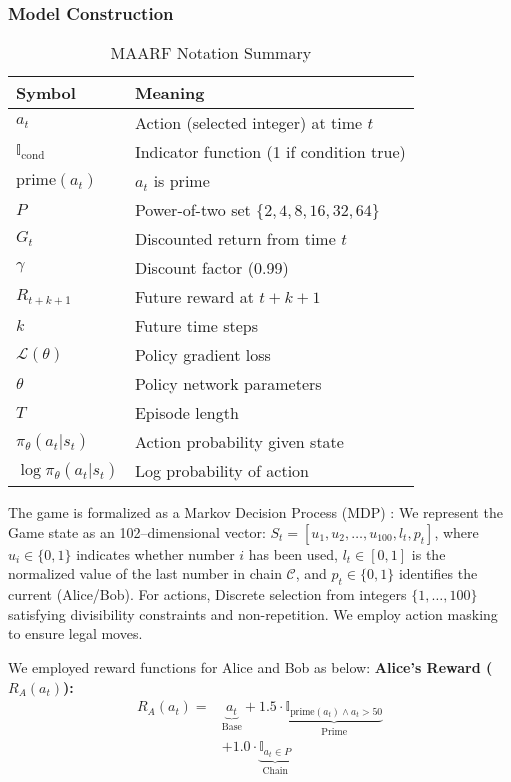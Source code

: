 \documentclass[twocolumn, a4paper]{article}
\begin{document}
\subsubsection{Model Construction}
\begin{table}[h]
\centering
\scriptsize
\caption{MAARF Notation Summary}
\begin{tabular}{@{}ll@{}}
\toprule
\textbf{Symbol} & \textbf{Meaning} \\
\midrule
$a_t$ & Action (selected integer) at time $t$ \\
$\mathbb{I}_{\text{cond}}$ & Indicator function (1 if condition true) \\
$\text{prime}(a_t)$ & $a_t$ is prime \\
$P$ & Power-of-two set $\{2,4,8,16,32,64\}$ \\
$G_t$ & Discounted return from time $t$ \\
$\gamma$ & Discount factor (0.99) \\
$R_{t+k+1}$ & Future reward at $t+k+1$ \\
$k$ & Future time steps \\
$\mathcal{L}(\theta)$ & Policy gradient loss \\
$\theta$ & Policy network parameters \\
$T$ & Episode length \\
$\pi_\theta(a_t|s_t)$ & Action probability given state \\
$\log\pi_\theta(a_t|s_t)$ & Log probability of action \\
\bottomrule
\end{tabular}
\end{table}
The game is formalized as a Markov Decision Process (MDP) \textsuperscript{\cite{sutton2018reinforcement}}:
We represent the Game state as an 102--dimensional vector: $S_t=[u_1, u_2, \dots, u_{100}, l_t, p_t]$, where $u_i\in \{0, 1\}$ indicates whether number $i$ has been used, $l_t\in [0,1]$ is the normalized value of the last number in chain $\mathcal{C}$, and $p_t\in \{0, 1\}$ identifies the current (Alice/Bob).
For actions, Discrete selection from integers $\{1, \dots, 100\}$ satisfying divisibility constraints and non-repetition. We employ action masking to ensure legal moves.

We employed reward functions for Alice and Bob as below:
\textbf{Alice's Reward ($R_A(a_t)$):}
\begin{equation}
\begin{aligned}
R_A(a_t) = &\underbrace{a_t}_{\text{Base}} + 1.5 \cdot \underbrace{\mathbb{I}_{\text{prime}(a_t) \land a_t > 50}}_{\text{Prime}} \\
&+ 1.0 \cdot \underbrace{\mathbb{I}_{a_t \in P}}_{\text{Chain}}
\end{aligned}
\end{equation}
 
\end{document}

